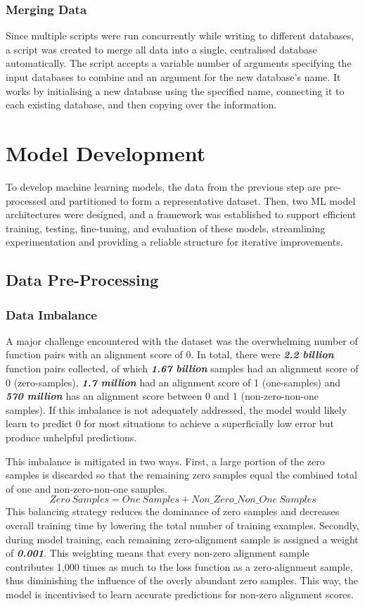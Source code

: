 \subsubsection{Merging Data}
Since multiple scripts were run concurrently while writing to different databases, a script was created to merge all data into a single, centralised database automatically. The script accepts a variable number of arguments specifying the input databases to combine and an argument for the new database's name. It works by initialising a new database using the specified name, connecting it to each existing database, and then copying over the information.

\section{Model Development} \label{Design:ModelDevelopment}
To develop machine learning models, the data from the previous step are pre-processed and partitioned to form a representative dataset. Then, two ML model architectures were designed, and a framework was established to support efficient training, testing, fine-tuning, and evaluation of these models, streamlining experimentation and providing a reliable structure for iterative improvements.

\subsection{Data Pre-Processing}
\subsubsection{Data Imbalance} \label{Design:DataImbalance}
A major challenge encountered with the dataset was the overwhelming number of function pairs with an alignment score of 0. In total, there were \textbf{\textit{2.2 billion}} function pairs collected, of which \textbf{\textit{1.67 billion}} samples had an alignment score of 0 (zero-samples), \textbf{\textit{1.7 million}} had an alignment score of 1 (one-samples) and \textbf{\textit{570 million}} has an alignment score between 0 and 1 (non-zero-non-one samples). If this imbalance is not adequately addressed, the model would likely learn to predict 0 for most situations to achieve a superficially low error but produce unhelpful predictions.

This imbalance is mitigated in two ways. First, a large portion of the zero samples is discarded so that the remaining zero samples equal the combined total of one and non-zero-non-one samples.
$$Zero\ Samples = One\ Samples + Non\_Zero\_Non\_One\ Samples$$
This balancing strategy reduces the dominance of zero samples and decreases overall training time by lowering the total number of training examples. Secondly, during model training, each remaining zero-alignment sample is assigned a weight of \textbf{\textit{0.001}}. This weighting means that every non-zero alignment sample contributes 1,000 times as much to the loss function as a zero-alignment sample, thus diminishing the influence of the overly abundant zero samples. This way, the model is incentivised to learn accurate predictions for non-zero alignment scores.


